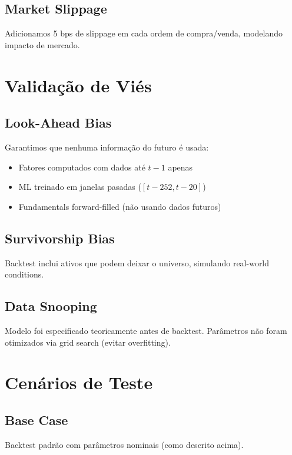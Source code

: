 \documentclass[12pt,a4paper]{article}
\begin{document}
\subsection{Market Slippage}

Adicionamos 5 bps de slippage em cada ordem de compra/venda, modelando impacto de mercado.

\section{Validação de Viés}

\subsection{Look-Ahead Bias}

Garantimos que nenhuma informação do futuro é usada:
\begin{itemize}
    \item Fatores computados com dados até $t-1$ apenas
    \item ML treinado em janelas pasadas ($[t-252, t-20]$)
    \item Fundamentals forward-filled (não usando dados futuros)
\end{itemize}

\subsection{Survivorship Bias}

Backtest inclui ativos que podem deixar o universo, simulando real-world conditions.

\subsection{Data Snooping}

Modelo foi especificado teoricamente antes de backtest. Parâmetros não foram otimizados via grid search (evitar overfitting).

\section{Cenários de Teste}

\subsection{Base Case}

Backtest padrão com parâmetros nominais (como descrito acima).
\end{document}
